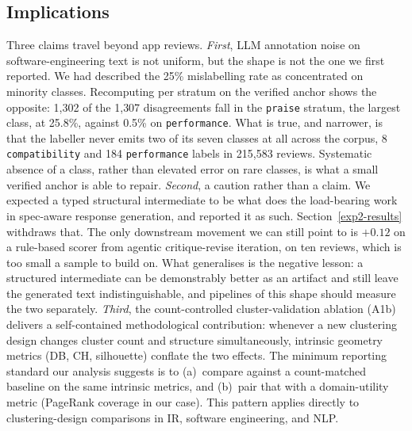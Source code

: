 \documentclass[sigconf, anonymous]{acmart}
\begin{document}
\subsection{Implications}
Three claims travel beyond app reviews. \emph{First}, LLM annotation noise on
  software-engineering text is not uniform, but the shape is not the one we first reported. We
  had described the 25\% mislabelling rate as concentrated on minority classes. Recomputing per
  stratum on the verified anchor shows the opposite: 1{,}302 of the 1{,}307 disagreements fall in
  the \texttt{praise} stratum, the largest class, at 25.8\%, against 0.5\% on
  \texttt{performance}. What is true, and narrower, is that the labeller never emits two of its
  seven classes at all across the corpus, 8 \texttt{compatibility} and 184 \texttt{performance}
  labels in 215{,}583 reviews. Systematic absence of a class, rather than elevated error on rare
  classes, is what a small verified anchor is able to repair. \emph{Second}, a caution rather than a claim. We expected a typed structural intermediate to be
  what does the load-bearing work in spec-aware response generation, and reported it as such.
  Section~\ref{exp2-results} withdraws that. The only downstream movement we can still point to
  is $+0.12$ on a rule-based scorer from agentic critique-revise iteration, on ten reviews, which
  is too small a sample to build on. What generalises is the negative lesson: a structured
  intermediate can be demonstrably better as an artifact and still leave the generated text
  indistinguishable, and pipelines of this shape should measure the two separately. \emph{Third}, the count-controlled
  cluster-validation ablation (A1b) delivers a self-contained methodological contribution:
  whenever a new clustering design changes cluster count and structure simultaneously, intrinsic
   geometry metrics (DB, CH, silhouette) conflate the two effects. The minimum reporting
  standard our analysis suggests is to (a)~compare against a count-matched baseline on the same
  intrinsic metrics, and (b)~pair that with a domain-utility metric (PageRank coverage in our
  case). This pattern applies directly to clustering-design comparisons in IR, software
  engineering, and NLP.
\end{document}
